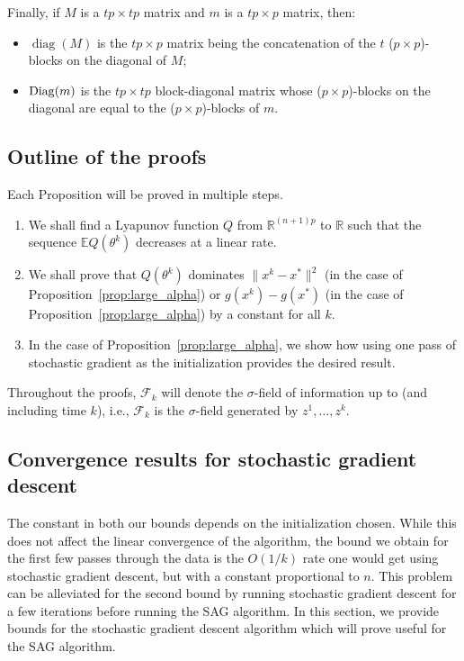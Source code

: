 \documentclass{article}
\newcommand{\diag}{\mathop{\rm diag}}
\newcommand{\Diag}{\mathop{\rm Diag}}
\newcommand{\rb}{\mathbb{R}}
\def\diag{\operatorname{diag}}
\def\E{_{\scriptscriptstyle E}}
\def \E{{\mathbb E}}
\def \E{{\mathbb E}}
\begin{document}
Finally, if $M$ is a $tp \times tp$ matrix and $m$ is a $tp \times p$ matrix, then:
\begin{itemize}
\item $\diag(M)$ is the $tp \times p$ matrix being the concatenation of the $t$ ($p \times p$)-blocks on the diagonal of $M$;
\item $\Diag(m)$ is the $tp \times tp$ block-diagonal matrix whose ($p \times p$)-blocks on the diagonal are equal to the ($p \times p$)-blocks of $m$.
\end{itemize}

\subsection{Outline of the proofs}
Each Proposition will be proved in multiple steps.
\begin{enumerate}
\item We shall find a Lyapunov function $Q$ from $\rb^{(n+1)p}$ to $\rb$ such that the sequence $\E Q(\theta^k)$ decreases at a linear rate.
\item We shall prove that $Q(\theta^k)$ dominates $\|x^k - x^\ast\|^2$ (in the case of Proposition~\ref{prop:large_alpha}) or $g(x^k) - g(x^\ast)$ (in the case of Proposition~\ref{prop:large_alpha}) by a constant for all $k$.
\item In the case of Proposition~\ref{prop:large_alpha}, we show how using one pass of stochastic gradient as the initialization provides the desired result.
\end{enumerate}

Throughout the proofs, $\mathcal{F}_{k}$ will denote the $\sigma$-field of information up to (and including time $k$), i.e., $\mathcal{F}_k$ is the $\sigma$-field generated by $z^1,\dots,z^k$.

\subsection{Convergence results for stochastic gradient descent}
\label{sec:bound_values_sg}
The constant in both our bounds depends on the initialization chosen. While this does not affect the linear convergence of the algorithm, the bound we obtain for the first few passes through the data is the $O(1/k)$ rate one would get using stochastic gradient descent, but with a constant proportional to $n$. This problem can be alleviated for the second bound by running stochastic gradient descent for a few iterations before running the SAG algorithm. In this section, we provide bounds for the stochastic gradient descent algorithm which will prove useful for the SAG algorithm.
\end{document}
